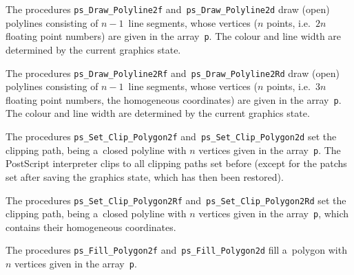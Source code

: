 \vspace{\bigskipamount}
\begin{sloppypar}
The procedures \texttt{ps\_Draw\_Polyline2f} and~\texttt{ps\_Draw\_Polyline2d}
draw (open) polylines consisting of $n-1$~line segments, whose
vertices ($n$ points, i.e.\ $2n$ floating point numbers)
are given in the array~\texttt{p}. The colour and line width are
determined by the current graphics state.%
\end{sloppypar}

\vspace{\bigskipamount}
\begin{sloppypar}
The procedures \texttt{ps\_Draw\_Polyline2Rf}
and~\texttt{ps\_Draw\_Polyline2Rd}
draw (open) polylines consisting of $n-1$~line segments, whose
vertices ($n$ points, i.e.\ $3n$ floating point numbers, the homogeneous
coordinates) are given in the array~\texttt{p}. The colour and line width
are determined by the current graphics state.%
\end{sloppypar}

\vspace{\bigskipamount}
The procedures \texttt{ps\_Set\_Clip\_Polygon2f}
and~\texttt{ps\_Set\_Clip\_Polygon2d} set the clipping path, being a~closed
polyline with $n$ vertices given in the array~\texttt{p}.
The PostScript interpreter clips to all clipping paths set before
(except for the patchs set after saving the graphics state, which has then
been restored).

\vspace{\bigskipamount}
The procedures \texttt{ps\_Set\_Clip\_Polygon2Rf}
and~\texttt{ps\_Set\_Clip\_Polygon2Rd} set the clipping path, being a~closed
polyline with $n$ vertices given in the array~\texttt{p}, which contains
their homogeneous coordinates.

\newpage
The procedures \texttt{ps\_Fill\_Polygon2f} and~\texttt{ps\_Fill\_Polygon2d}
fill a~polygon with $n$ vertices given in the array~\texttt{p}.

